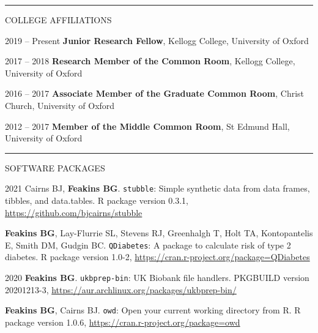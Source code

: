 \documentclass[10pt,a4paper]{article}
\begin{document}
\noindent\rule{\textwidth}{0.4pt}
\begin{cvlist}{COLLEGE AFFILIATIONS}
	
	\item[2019 -- Present]
	\textbf{Junior Research Fellow}, Kellogg College, University of Oxford
	
	\item[2017 -- 2018]
	\textbf{Research Member of the Common Room}, Kellogg College, University of Oxford
	
	\begin{comment}
	\item[2017 -- Present]
	\textbf{Old Member of the Middle Common Room}, St Edmund Hall, University of Oxford
	\end{comment}
	
	\item[2016 -- 2017]
	\textbf{Associate Member of the Graduate Common Room}, Christ Church, University of Oxford
	
	\item[2012 -- 2017]
	\textbf{Member of the Middle Common Room}, St Edmund Hall, University of Oxford
	
\end{cvlist}


\noindent\rule{\textwidth}{0.4pt}
\begin{cvlist}{SOFTWARE PACKAGES}
	
	\item[2021]
	Cairns BJ, \textbf{Feakins BG}. \texttt{stubble}: Simple synthetic data from data frames, tibbles, and data.tables. R package version 0.3.1, \url{https://github.com/bjcairns/stubble}
	
	\item[]
	\textbf{Feakins BG}, Lay-Flurrie SL, Stevens RJ, Greenhalgh T, Holt TA, Kontopantelis E, Smith DM, Gudgin BC. \texttt{QDiabetes}: A package to calculate risk of type 2 diabetes. R package version 1.0-2, \url{https://cran.r-project.org/package=QDiabetes}
	
	\item[2020]
	\textbf{Feakins BG}. \texttt{ukbprep-bin}: UK Biobank file handlers. PKGBUILD version 20201213-3, \url{https://aur.archlinux.org/packages/ukbprep-bin/}
	
	\item[]
	\textbf{Feakins BG}, Cairns BJ. \texttt{owd}: Open your current working directory from R. R package version 1.0.6, \url{https://cran.r-project.org/package=owd}
	
\end{cvlist}
\end{document}
